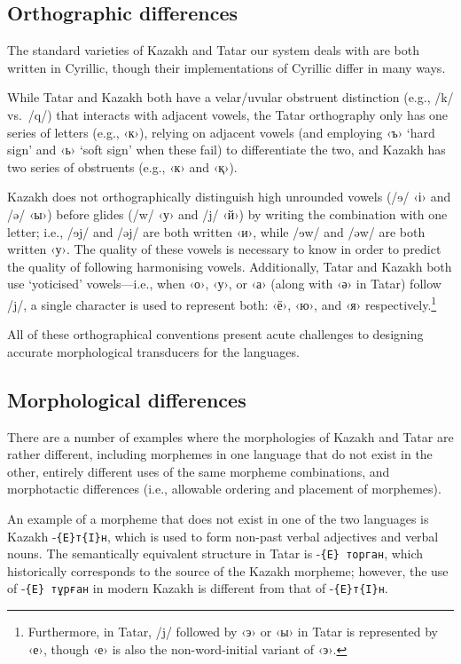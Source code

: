 \documentclass[a4paper,11pt]{article}
\begin{document}
\subsection{Orthographic differences}
The standard varieties of Kazakh and Tatar our system deals with are both written in Cyrillic, though their 
implementations of Cyrillic differ in many ways.

While Tatar and Kazakh both have a velar/uvular obstruent distinction (e.g., /k/ vs.\ /q/) that interacts with 
adjacent vowels, the Tatar orthography only has one series of letters (e.g., ‹к›), relying on adjacent 
vowels (and employing ‹ъ› `hard sign' and ‹ь› `soft sign' when these fail) to differentiate the two, and Kazakh 
has two series of obstruents (e.g., ‹к› and ‹қ›).

Kazakh does not orthographically distinguish high unrounded vowels (/{\qipa ɘ}/ ‹і› and /ə/ ‹ы›) before 
glides (/w/ ‹у› and /j/ ‹й›) by writing the combination with one letter; i.e., /{\qipa ɘ}j/ and /əj/ are both 
written ‹и›, while /{\qipa ɘ}w/ and /əw/ are both written ‹у›.  The quality of these vowels is necessary to know in 
order to predict the quality of following harmonising vowels. %
Additionally, Tatar and Kazakh both use `yoticised' vowels---i.e., when ‹о›, ‹у›, or ‹а› (along with ‹ә› in 
Tatar) follow /j/, a single character is used to represent both: ‹ё›, ‹ю›, and ‹я› respectively.\footnote{Furthermore, in Tatar, /j/ followed by ‹э› or ‹ы› in Tatar is represented by ‹е›, though ‹е› is also the non-word-initial variant of ‹э›.}  %

All of these orthographical conventions present acute challenges to designing accurate morphological transducers for the languages.

\subsection{Morphological differences}
There are a number of examples where the morphologies of Kazakh and Tatar are rather different, including 
morphemes in one language that do not exist in the other, entirely different uses of the same morpheme 
combinations, and morphotactic differences (i.e., allowable ordering and placement of morphemes).

An example of a morpheme that does not exist in one of the two languages is Kazakh -\texttt{\{E\}т\{I\}н}, 
which is used to form non-past verbal adjectives and verbal nouns.  The semantically equivalent structure 
in Tatar is -\texttt{\{E\} торган}, which historically corresponds to the source of the Kazakh morpheme; 
however, the use of -\texttt{\{E\} тұрған} in modern Kazakh is different from that of -\texttt{\{E\}т\{I\}н}.
\end{document}

